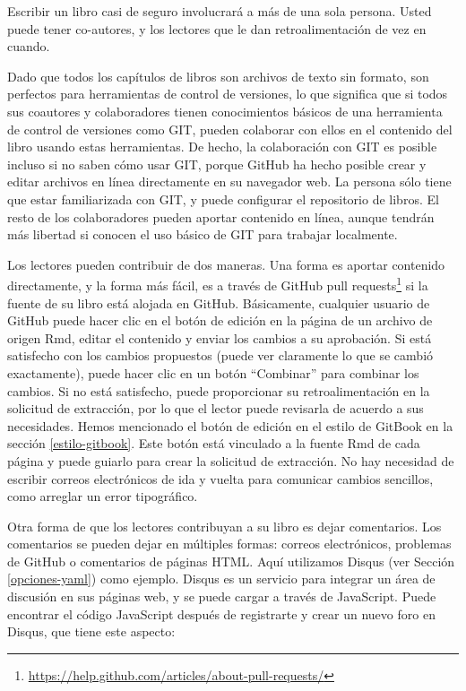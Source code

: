 \documentclass[12pt,]{krantz}
\renewcommand{\href}[2]{#2\footnote{\url{#1}}}
\theoremstyle{definition}
\theoremstyle{definition}
\theoremstyle{definition}
\theoremstyle{remark}
\begin{document}
Escribir un libro casi de seguro involucrará a más de una sola persona.
Usted puede tener co-autores, y los lectores que le dan
retroalimentación de vez en cuando.

Dado que todos los capítulos de libros son archivos de texto sin
formato, son perfectos para herramientas de control de versiones, lo que
significa que si todos sus coautores y colaboradores tienen
conocimientos básicos de una herramienta de control de versiones como
GIT, pueden colaborar con ellos en el contenido del libro usando estas
herramientas. De hecho, la colaboración con GIT es posible incluso si no
saben cómo usar GIT, porque GitHub  ha hecho posible crear
y editar archivos en línea directamente en su navegador web. La persona
sólo tiene que estar familiarizada con GIT, y puede configurar el
repositorio de libros. El resto de los colaboradores pueden aportar
contenido en línea, aunque tendrán más libertad si conocen el uso básico
de GIT para trabajar localmente.

Los lectores pueden contribuir de dos maneras. Una forma es aportar
contenido directamente, y la forma más fácil, es a través de
\href{https://help.github.com/articles/about-pull-requests/}{GitHub pull
requests} si la fuente de su libro está alojada en GitHub. Básicamente,
cualquier usuario de GitHub puede hacer clic en el botón de edición en
la página de un archivo de origen Rmd, editar el contenido y enviar los
cambios a su aprobación. Si está satisfecho con los cambios propuestos
(puede ver claramente lo que se cambió exactamente), puede hacer clic en
un botón ``Combinar'' para combinar los cambios. Si no está satisfecho,
puede proporcionar su retroalimentación en la solicitud de extracción,
por lo que el lector puede revisarla de acuerdo a sus necesidades. Hemos
mencionado el botón de edición en el estilo de GitBook en la sección
\ref{estilo-gitbook}. Este botón está vinculado a la fuente Rmd de cada
página y puede guiarlo para crear la solicitud de extracción. No hay
necesidad de escribir correos electrónicos de ida y vuelta para
comunicar cambios sencillos, como arreglar un error tipográfico.

Otra forma de que los lectores contribuyan a su libro es dejar
comentarios. Los comentarios se pueden dejar en múltiples formas:
correos electrónicos, problemas de GitHub o comentarios de páginas HTML.
Aquí utilizamos Disqus (ver Sección \ref{opciones-yaml}) como ejemplo.
Disqus es un servicio para integrar un área de discusión en sus páginas
web, y se puede cargar a través de JavaScript. Puede encontrar el código
JavaScript después de registrarte y crear un nuevo foro en Disqus, que
tiene este aspecto:
\end{document}
